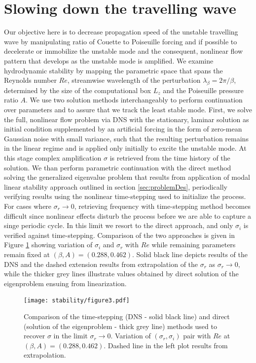 \documentclass[lineno]{jfm}
\begin{document}
\section{Slowing down the travelling wave}\label{sec:linearStability}
Our objective here is to decrease propagation speed of the unstable travelling wave by manipulating ratio of Couette to Poiseuille forcing and if possible to decelerate or immobilize the unstable mode and the consequent,
nonlinear flow pattern that develops as the unstable mode is amplified.
We examine hydrodynamic stability by mapping the parametric space that spans the Reynolds number $Re$,
streamwise wavelength of the perturbation $\lambda_\beta = 2\pi/\beta$, determined by the size of the computational box $L_z$ and the Poiseuille pressure ratio $A$.
We use two solution methods interchangeably to perform continuation over parameters and to assure that we track the least stable mode.
First, we solve the full, nonlinear flow problem via DNS with the stationary, laminar solution as initial condition supplemented by an artificial forcing in the form of zero-mean Gaussian noise with small variance, such that the resulting perturbation remains in the linear regime and is applied only initially to excite the unstable mode.
At this stage complex amplification $\sigma$ is retrieved from the time history of the solution.
We than perform parametric continuation with the direct method solving the generalized eigenvalue problem that results from application of modal linear stability approach outlined in section \ref{sec:problemDes}, periodically verifying results using the nonlinear time-stepping used to initialize the process.
For cases where $\sigma_r\to0$, retrieving frequency with time-stepping method becomes difficult since nonlinear effects disturb the process before we are able to capture a singe periodic cycle.
In this limit we resort to the direct approach, and only $\sigma_i$ is verified against time-stepping.
Comparison of the two approaches is given in Figure \ref{fig:dns_vs_tmiestep} showing variation of $\sigma_i$ and $\sigma_r$ with $Re$ while remaining parameters remain fixed at $(\beta,A)=(0.288, 0.462)$.
Solid black line depicts results of the DNS and the dashed extension results from extrapolation of the $\sigma_r$ as $\sigma_r\to0$, while the thicker grey lines illustrate values obtained by direct solution of the eigenproblem ensuing from linearization.

\begin{figure}
\centering
	\texttt{[image: stability/figure3.pdf]}
	\caption{Comparison of the time-stepping (DNS - solid black line) and direct (solution of the eigenproblem - thick grey line) methods used to recover $\sigma$ in the limit $\sigma_r\to0$. Variation of $(\sigma_r, \sigma_i)$ pair with $Re$ at $(\beta,A)=(0.288, 0.462)$. Dashed line in the left plot results from extrapolation.}
	\label{fig:dns_vs_tmiestep}
\end{figure}
\end{document}
